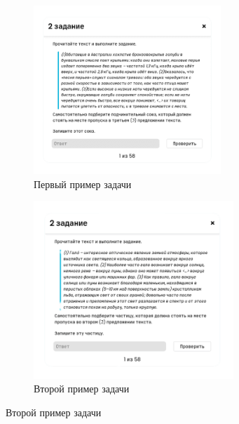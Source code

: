 \documentclass[a4paper, 12pt]{extarticle}
\begin{document}
\begin{enumerate}
\begin{figure}[h]
\begin{subfigure}{.5\textwidth}
            \centering
            \includegraphics[height=180pt]{./img/1Sequence.png}
            \caption{Первый пример задачи}
        \end{subfigure}
        \begin{subfigure}{.5\textwidth}
            \centering
            \includegraphics[height=190pt]{./img/2Sequence.png}
            \caption{Второй пример задачи}
        \end{subfigure}
    \end{figure}


\end{enumerate}
\end{document}
